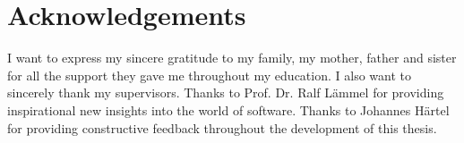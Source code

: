 \chapter*{Acknowledgements}
I want to express my sincere gratitude to my family, my mother, father and sister for all the support they gave me throughout my education.
\newline
\vspace*{.1in}
\newline
\noindent
I also want to sincerely thank my supervisors.
Thanks to Prof. Dr. Ralf Lämmel for providing inspirational new insights into the world of software.
Thanks to Johannes Härtel for providing constructive feedback throughout the development of this thesis.
